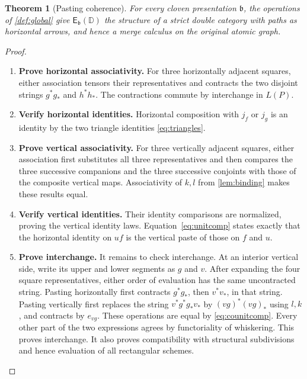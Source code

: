 \documentclass[11pt,reqno]{amsart}
\theoremstyle{plain}
\newtheorem{theorem}{Theorem}[section]
\theoremstyle{definition}
\theoremstyle{remark}
\numberwithin{equation}{section}
\newcommand{\D}{\mathbb D}
\newcommand{\E}{\mathsf E}
\begin{document}
\begin{theorem}[Pasting coherence]\label{thm:globalcoherence}
For every cloven presentation $\mathfrak b$, the operations of
\cref{def:global} give $\E_{\mathfrak b}(\D)$ the structure of a strict
double category with paths as horizontal arrows, and hence a merge
calculus on the original atomic graph.
\end{theorem}
\begin{proof}\leavevmode
\begin{enumerate}
\item \textbf{Prove horizontal associativity.} For three horizontally adjacent squares, either association tensors their
representatives and contracts the two disjoint strings $g^*g_*$ and
$h^*h_*$. The contractions commute by interchange in $L(P)$.

\item \textbf{Verify horizontal identities.} Horizontal composition with $j_f$ or $j_g$ is an identity by the two
triangle identities \cref{eq:triangles}.

\item \textbf{Prove vertical associativity.} For three vertically adjacent squares, either association first substitutes
all three representatives and then compares the three successive
companions and the three successive conjoints with those of the composite
vertical maps. Associativity of $k,l$ from \cref{lem:binding} makes
these results equal.

\item \textbf{Verify vertical identities.} Their identity comparisons are normalized, proving
the vertical identity laws. Equation~\eqref{eq:unitcomp} states exactly
that the horizontal identity on $uf$ is the vertical paste of those on
$f$ and $u$.

\item \textbf{Prove interchange.} It remains to check interchange. At an interior vertical side, write its
upper and lower segments as $g$ and $v$. After expanding the four square
representatives, either order of evaluation has the same uncontracted
string. Pasting horizontally first contracts $g^*g_*$, then $v^*v_*$,
in that string. Pasting vertically first replaces the string
$v^*g^*g_*v_*$ by $(vg)^*(vg)_*$ using $l,k$, and contracts by
$e_{vg}$. These operations are equal by \cref{eq:counitcomp}.
Every other part of the two expressions agrees by functoriality of
whiskering. This proves interchange. It also proves compatibility with
structural subdivisions and hence evaluation of all rectangular schemes.\qedhere
\end{enumerate}
\end{proof}
\end{document}
